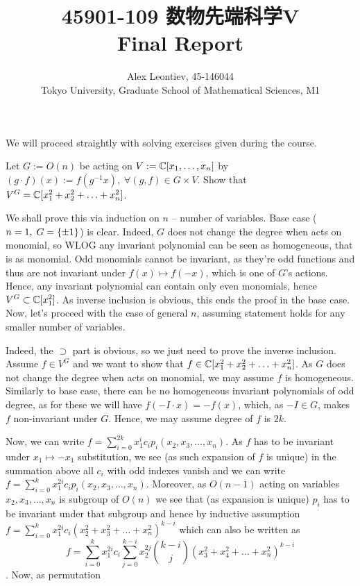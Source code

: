\documentclass[8pt]{article} %
\title{45901-109 数物先端科学V\\Final Report}
\author{Alex Leontiev, 45-146044
\\Tokyo University, Graduate School of Mathematical Sciences, M1}
\newcommand{\myprobshort}[2]{\begin{myprob}[#1]#2\end{myprob}}
\begin{document}
\begin{CJK}{UTF8}{bsmi}
\maketitle
\end{CJK}
We will proceed straightly with solving exercises given during the course.
\myprobshort{April 7, Example  1.13}{ Let $G:=O(n)$ be acting on $V:=\mathbb{C}[x_1,\hdots,x_n]$ by $(g\cdot f)(x):=
f(g^{ -1 }x),\;\forall (g,f)\in G\times V$. Show that $V^G=\mathbb{C}[x_1^2+x_2^2+\hdots+x_n^2]$.}
We shall prove this via induction on $n$ -- number of variables. Base case ($n=1,\;G=\left\{ \pm1 \right\}$) is clear. Indeed, $G$
does not change the degree when acts on monomial, so WLOG any invariant polynomial can be seen as homogeneous, that is as monomial.
Odd monomials cannot be invariant, as they're odd functions and thus are not invariant under $f(x)\mapsto f(-x)$, which is one
of $G$'s actions. Hence, any invariant polynomial can contain only even monomials, hence $V^G\subset\mathbb{C}[x_1^2]$. As inverse inclusion
is obvious, this ends the proof in the base case. Now, let's proceed with the case of general $n$, assuming statement holds for any
smaller number of variables.\par
Indeed, the $\supset$ part is obvious, so we just need to prove the inverse inclusion. Assume $f\in V^G$ and we want to show
that $f\in\mathbb{C}[x_1^2+x_2^2+\hdots+x_n^2]$. As $G$ does not change the degree when acts on monomial, we may assume $f$ is homogeneous.
Similarly to base case,
there can be no homogeneous invariant polynomials of odd degree, as for these we will have $f(-I\cdot x)=-f(x)$,
which, as $-I\in G$, makes $f$ non-invariant under $G$. Hence, we may assume degree of $f$ is $2k$.\par
Now, we can write $f=\sum_{i=0}^{ 2k }x_1^{ i }c_ip_i(x_2,x_3,\hdots,x_n)$. As $f$ has to be invariant under $x_1\mapsto -x_1$
substitution, we see (as such expansion of $f$ is unique) in the summation above all $c_i$ with odd indexes vanish and we can write
$f=\sum_{i=0}^{ k }x_1^{ 2i }c_ip_i(x_2,x_3,\hdots,x_n)$. Moreover, as $O(n-1)$ acting on variables $x_2,x_3,\hdots,x_n$
is subgroup of $O(n)$ we see that (as expansion is unique) $p_i$ has to be invariant under that subgroup and hence
by inductive assumption $f=\sum_{i=0}^{ k }x_1^{ 2i }c_i(x_2^2+x_3^2+\hdots+x_n^2)^{ k-i }$ which can also be written as
\begin{equation}\label{Prob1}
	f=\sum_{i=0}^{ k }x_1^{ 2i }c_i\sum_{ j=0 }^{ k-i }x_2^{ 2j }\binom{k-i}{j}(x_3^2+x_4^2+\hdots+x_n^2)^{ k-i }
\end{equation}. Now, as permutation
\end{document}
